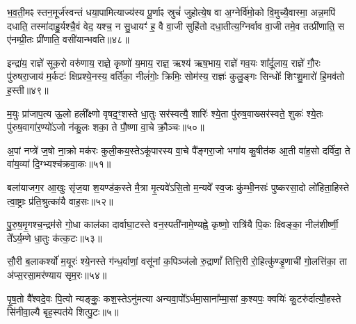 भ॒व॒ती॒मꣴ स्तन॒मूर्ज॑स्वन्तं धया॒पामित्याज्य॑स्य पू॒र्णाꣴ स्रुचं॑ जुहोत्ये॒ष वा अ॒ग्नेर्वि॑मो॒को वि॒मुच्यै॒वास्मा॒ अन्न॒मपि॑ दधाति॒ तस्मा॑दाहु॒र्यश्चै॒वं वेद॒ यश्च॒ न सु॒धायꣳ॑ ह॒ वै वा॒जी सुहि॑तो दधा॒तीत्य॒ग्निर्वाव वा॒जी तमे॒व तत्प्री॑णाति॒ स ए॑नम्प्री॒तः प्री॑णाति॒ वसी॑यान्भवति॥४८॥

{\anuvakamend[{प्र॒तीची॒ दिक्तस्या᳚स्ते द्वि॒ष्मो यश्च॑ निलि॒म्पा नामे॒ह गृ॒हा इति॑ लू॒क्षो वसी॑यान्भवति॥10॥}]}

इन्द्रा॑य॒ राज्ञे॑ सूक॒रो वरु॑णाय॒ राज्ञे॒ कृष्णो॑ य॒माय॒ राज्ञ॒ ऋश्य॑ ऋष॒भाय॒ राज्ञे॑ गव॒यः शा᳚र्दू॒लाय॒ राज्ञे॑ गौ॒रः पु॑रुषरा॒जाय॑ म॒र्कटः॑ क्षिप्रश्ये॒नस्य॒ वर्ति॑का॒ नीलं॑गोः॒ क्रिमिः॒ सोम॑स्य॒ राज्ञः॑ कुलु॒ङ्गः सिन्धोः᳚ शिꣳशु॒मारो॑ हि॒मव॑तो ह॒स्ती॥४९॥

{\anuvakamend[{इन्द्रा॑या॒ष्टाविꣳ॑शतिः॥11॥}]}

म॒युः प्रा॑जाप॒त्य ऊ॒लो हली᳚क्ष्णो वृषद॒ꣳ॒शस्ते धा॒तुः सर॑स्वत्यै॒ शारिः॑ श्ये॒ता पु॑रुष॒वाख्सर॑स्वते॒ शुकः॑ श्ये॒तः पु॑रुष॒वागा॑र॒ण्यो॑\-ऽजो न॑कु॒लः शका॒ ते पौ॒ष्णा वा॒चे क्रौ॒ञ्चः॥५०॥

{\anuvakamend[{म॒युस्त्रयो॑विꣳशतिः॥12॥}]}

अ॒पां नप्त्रे॑ ज॒षो ना॒क्रो मक॑रः कुली॒कय॒स्ते\-ऽकू॑पारस्य वा॒चे पै᳚ङ्गरा॒जो भगा॑य कु॒षीत॑क आ॒ती वा॑ह॒सो दर्वि॑दा॒ ते वा॑य॒व्या॑ दि॒ग्भ्यश्च॑क्रवा॒कः॥५१॥

{\anuvakamend[{अ॒पामेका॒न्नविꣳ॑शतिः॥13॥}]}

बला॑याजग॒र आ॒खुः सृ॑ज॒या श॒यण्ड॑क॒स्ते मै॒त्रा मृ॒त्यवे॑\-ऽसि॒तो म॒न्यवे᳚ स्व॒जः कु॑म्भी॒नसः॑ पुष्करसा॒दो लो॑हिता॒हिस्ते त्वा॒ष्ट्राः प्र॑ति॒श्रुत्का॑यै वाह॒सः॥५२॥

{\anuvakamend[{}]}

पु॒रु॒ष॒मृ॒गश्च॒न्द्रम॑से गो॒धा काल॑का दार्वाघा॒टस्ते वन॒स्पती॑नामे॒ण्यह्ने॒ कृष्णो॒ रात्रि॑यै पि॒कः क्ष्विङ्का॒ नील॑शीर्ष्णी॒ ते᳚\-ऽर्य॒म्णे धा॒तुः क॑त्क॒टः॥५३॥

{\anuvakamend[{}]}

सौ॒री ब॒लाकर्श्यो॑ म॒यूरः॑ श्ये॒नस्ते ग॑न्ध॒र्वाणां॒ वसू॑नां क॒पिञ्ज॑लो रु॒द्राणां᳚ तित्ति॒री रो॒हित्कु॑ण्डृ॒णाची॑ गो॒लत्ति॑का॒ ता अ॑प्स॒रसा॒मर॑ण्याय सृम॒रः॥५४॥

{\anuvakamend[{}]}

पृ॒ष॒तो वै᳚श्वदे॒वः पि॒त्वो न्यङ्कुः॒ कश॒स्ते\-ऽनु॑मत्या अन्यवा॒पो᳚\-ऽर्धमा॒साना᳚म्मा॒सां क॒श्यपः॒ क्वयिः॑ कु॒टरु॑र्दात्यौ॒हस्ते सि॑नीवा॒ल्यै बृह॒स्पत॑ये शित्पु॒टः॥५॥

